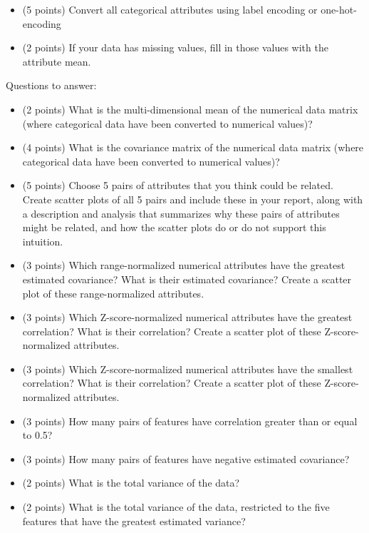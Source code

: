 \documentclass[11pt]{article}
\begin{document}
\begin{itemize}

    \item (5 points) Convert all categorical attributes using label encoding or
    one-hot-encoding

    \item (2 points) If your data has missing values, fill in those values with
    the attribute mean.

\end{itemize}

\noindent Questions to answer:
\begin{itemize}

    \item (2 points) What is the multi-dimensional mean of the numerical data matrix
    (where categorical data have been converted to numerical values)?

    \item (4 points) What is the covariance matrix of the numerical data matrix
    (where categorical data have been converted to numerical values)?

    \item (5 points) Choose 5 pairs of attributes that you think could be
    related. Create scatter plots of all 5 pairs and include these in your
    report, along with a description and analysis that summarizes why these
    pairs of attributes might be related, and how the scatter plots do or do not
    support this intuition.

    \item (3 points) Which range-normalized numerical attributes have the
    greatest estimated covariance? What is their estimated covariance? Create a
    scatter plot of these range-normalized attributes.

    \item (3 points) Which Z-score-normalized numerical attributes have the
    greatest correlation? What is their correlation? Create a scatter plot of
    these Z-score-normalized attributes.

    \item (3 points) Which Z-score-normalized numerical attributes have the
    smallest correlation? What is their correlation? Create a scatter plot of
    these Z-score-normalized attributes.

    \item (3 points) How many pairs of features have correlation greater than or
    equal to 0.5?

    \item (3 points) How many pairs of features have negative estimated
    covariance?

    \item (2 points) What is the total variance of the data?

    \item (2 points) What is the total variance of the data, restricted to the
    five features that have the greatest estimated variance?

\end{itemize}
\end{document}

